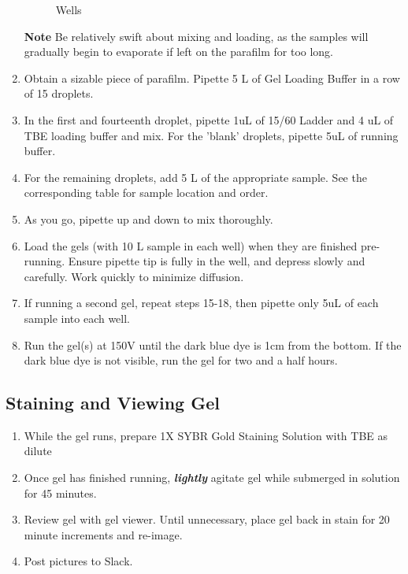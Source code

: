 \documentclass[letterpaper]{article}
\newcommand{\uL}{\micro{}L}
\begin{document}
\begin{enumerate}
\begin{figure}[ht]
\begin{center}
{\begin{tabular}{|l|l|}
\end{tabular}}
\label{tab:Gel Layout} %
\caption{Wells} %
\end{center}
\end{figure}
\textbf{Note} Be relatively swift about mixing and loading, as the samples will gradually begin to evaporate if left on the parafilm for too long.
\item{Obtain a sizable piece of parafilm. Pipette 5 \uL{} of Gel Loading Buffer in a row of 15 droplets.}
\item{In the first and fourteenth droplet, pipette 1uL of 15/60 Ladder and 4 uL of TBE loading buffer and mix. For the 'blank' droplets, pipette 5uL of running buffer.}
\item{For the remaining droplets, add 5 \uL{} of the appropriate sample. See the corresponding table for sample location and order.}
\item{As you go, pipette up and down to mix thoroughly.}
\item{Load the gels (with 10 \uL{} sample in each well) when they are finished pre-running. Ensure pipette tip is fully in the well, and depress slowly and carefully. Work quickly to minimize diffusion.}
\item{If running a second gel, repeat steps 15-18, then pipette only 5uL of each sample into each well.}
\item{Run the gel(s) at 150V until the dark blue dye is 1cm from the bottom. If the dark blue dye is not visible, run the gel for two and a half hours.}
\end{enumerate}

\subsection{Staining and Viewing Gel}
\begin{enumerate}
\item{While the gel runs, prepare 1X SYBR Gold Staining Solution with TBE as dilute}
\item{Once gel has finished running, \textbf{\textit{lightly}} agitate gel while submerged in solution for 45 minutes.}
\item{Review gel with gel viewer. Until unnecessary, place gel back in stain for 20 minute increments and re-image.}
\item{Post pictures to Slack.}\\
\end{enumerate} 
\end{document}
